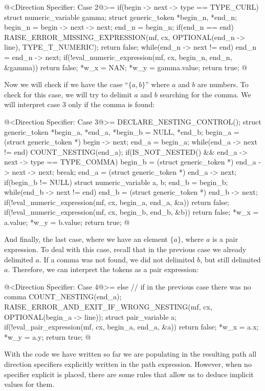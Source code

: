 {{{{{\iniciocodigo
@<Direction Specifier: Case 2@>=
if(begin -> next -> type == TYPE_CURL){
  struct numeric_variable gamma;
  struct generic_token *begin_n, *end_n;
  begin_n = begin -> next -> next;
  end_n = begin_n;
  if(end_n == end){
    RAISE_ERROR_MISSING_EXPRESSION(mf, cx, OPTIONAL(end_n -> line),
                                   TYPE_T_NUMERIC);
    return false;
  }
  while(end_n -> next != end)
    end_n = end_n -> next;
  if(!eval_numeric_expression(mf, cx, begin_n, end_n, &gamma))
    return false;
  *w_x = NAN;
  *w_y = gamma.value;
  return true;
}
@
\fimcodigo

Now we will check if we have the case ``$\{ a , b\}$'' where $a$ and
$b$ are numbers. To check for this case, we will try to delimit $a$
and $b$ searching for the comma. We will interpret case 3 only if
the comma is found:

\iniciocodigo
@<Direction Specifier: Case 3@>=
DECLARE_NESTING_CONTROL();
struct generic_token *begin_a, *end_a, *begin_b = NULL, *end_b;
begin_a = (struct generic_token *) begin -> next;
end_a = begin_a;
while(end_a -> next != end){
  COUNT_NESTING(end_a);
  if(IS_NOT_NESTED() && end_a -> next -> type == TYPE_COMMA){
    begin_b = (struct generic_token *) end_a -> next -> next;
    break;
  }
  end_a = (struct generic_token *) end_a -> next;
}
if(begin_b != NULL){
  struct numeric_variable a, b;
  end_b = begin_b;
  while(end_b -> next != end)
    end_b = (struct generic_token *) end_b -> next;
  if(!eval_numeric_expression(mf, cx, begin_a, end_a, &a))
    return false;
  if(!eval_numeric_expression(mf, cx, begin_b, end_b, &b))
    return false;
  *w_x = a.value;
  *w_y = b.value;
  return true;
}
@
\fimcodigo

And finally, the last case, where we have an element $\{a\}$, where
$a$ is a pair expression. To deal with this case, recall that in the
previous case we already delimited $a$. If a comma was not found, we
did not delimited $b$, but still delimited $a$. Therefore, we can
interpret the tokens as a pair expression:

\iniciocodigo
@<Direction Specifier: Case 4@>=
else{ // if in the previous case there was no comma
  COUNT_NESTING(end_a);
  RAISE_ERROR_AND_EXIT_IF_WRONG_NESTING(mf, cx, OPTIONAL(begin_a -> line));
  struct pair_variable a;
  if(!eval_pair_expression(mf, cx, begin_a, end_a, &a))
    return false;
  *w_x = a.x;
  *w_y = a.y;
  return true;
}
@
\fimcodigo

With the code we have written so far we are populating in the
resulting path all direction specifiers explicitly written in the path
expression.  However, when no specifier explicit is placed, there are
some rules that allow us to deduce implicit values ​​for them.

}}}}}
